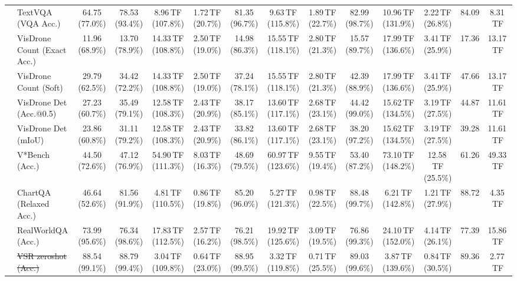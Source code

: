 \begin{table}[t]
\begin{center}
\begin{small}
\begin{sc}
{\begin{tabular}{llcccccccccccc}
& TextVQA (VQA Acc.) & 64.75 (77.0\%) & 78.53 (93.4\%) & 8.96\,TF (107.8\%) & 1.72\,TF (20.7\%) & 81.35 (96.7\%) & 9.63\,TF (115.8\%) & 1.89\,TF (22.7\%) & 82.99 (98.7\%) & 10.96\,TF (131.9\%) & 2.22\,TF (26.8\%) & 84.09 & 8.31\,TF \\
& VisDrone Count (Exact Acc.) & 11.96 (68.9\%) & 13.70 (78.9\%) & 14.33\,TF (108.8\%) & 2.50\,TF (19.0\%) & 14.98 (86.3\%) & 15.55\,TF (118.1\%) & 2.80\,TF (21.3\%) & 15.57 (89.7\%) & 17.99\,TF (136.6\%) & 3.41\,TF (25.9\%) & 17.36 & 13.17\,TF \\
& VisDrone Count (Soft) & 29.79 (62.5\%) & 34.42 (72.2\%) & 14.33\,TF (108.8\%) & 2.50\,TF (19.0\%) & 37.24 (78.1\%) & 15.55\,TF (118.1\%) & 2.80\,TF (21.3\%) & 42.39 (88.9\%) & 17.99\,TF (136.6\%) & 3.41\,TF (25.9\%) & 47.66 & 13.17\,TF \\
& VisDrone Det (Acc.@0.5) & 27.23 (60.7\%) & 35.49 (79.1\%) & 12.58\,TF (108.3\%) & 2.43\,TF (20.9\%) & 38.17 (85.1\%) & 13.60\,TF (117.1\%) & 2.68\,TF (23.1\%) & 44.42 (99.0\%) & 15.62\,TF (134.5\%) & 3.19\,TF (27.5\%) & 44.87 & 11.61\,TF \\
& VisDrone Det (mIoU) & 23.86 (60.8\%) & 31.11 (79.2\%) & 12.58\,TF (108.3\%) & 2.43\,TF (20.9\%) & 33.82 (86.1\%) & 13.60\,TF (117.1\%) & 2.68\,TF (23.1\%) & 38.20 (97.2\%) & 15.62\,TF (134.5\%) & 3.19\,TF (27.5\%) & 39.28 & 11.61\,TF \\
& V*Bench (Acc.) & 44.50 (72.6\%) & 47.12 (76.9\%) & 54.90\,TF (111.3\%) & 8.03\,TF (16.3\%) & 48.69 (79.5\%) & 60.97\,TF (123.6\%) & 9.55\,TF (19.4\%) & 53.40 (87.2\%) & 73.10\,TF (148.2\%) & 12.58\,TF (25.5\%) & 61.26 & 49.33\,TF \\
\midrule
{}
& ChartQA (Relaxed Acc.) & 46.64 (52.6\%) & 81.56 (91.9\%) & 4.81\,TF (110.5\%) & 0.86\,TF (19.8\%) & 85.20 (96.0\%) & 5.27\,TF (121.3\%) & 0.98\,TF (22.5\%) & 88.48 (99.7\%) & 6.21\,TF (142.8\%) & 1.21\,TF (27.9\%) & 88.72 & 4.35\,TF \\
& RealWorldQA (Acc.) & 73.99 (95.6\%) & 76.34 (98.6\%) & 17.83\,TF (112.5\%) & 2.57\,TF (16.2\%) & 76.21 (98.5\%) & 19.92\,TF (125.6\%) & 3.09\,TF (19.5\%) & 76.86 (99.3\%) & 24.10\,TF (152.0\%) & 4.14\,TF (26.1\%) & 77.39 & 15.86\,TF \\
& \sout{VSR zeroshot (Acc.)} & 88.54 (99.1\%) & 88.79 (99.4\%) & 3.04\,TF (109.8\%) & 0.64\,TF (23.0\%) & 88.95 (99.5\%) & 3.32\,TF (119.8\%) & 0.71\,TF (25.5\%) & 89.03 (99.6\%) & 3.87\,TF (139.6\%) & 0.84\,TF (30.5\%) & 89.36 & 2.77\,TF \\

\end{tabular}}
\end{sc}
\end{small}
\end{center}
\end{table}
